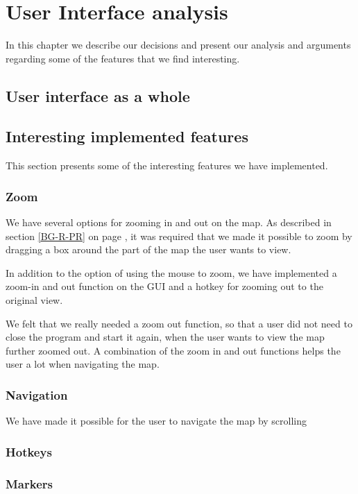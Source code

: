 \chapter{User Interface analysis}
\label{UIA}
In this chapter we describe our decisions and present our analysis and
arguments regarding some of the features that we find interesting.

\section{User interface as a whole}
\label{UIA-UIW}


\section{Interesting implemented features}
\label{UIA-IF}
This section presents some of the interesting features we have implemented.
\subsection{Zoom}
\label{UIA-IF-Z}
We have several options for zooming in and out on the map. As described in
section \ref{BG-R-PR} on page \pageref{BG-R-PR}, it was required that we made it
possible to zoom by dragging a box around the part of the map the user wants to
view.

In addition to the option of using the mouse to zoom, we have implemented a
zoom-in and out function on the GUI and a hotkey for zooming out to the original
view. 

We felt that we really needed a zoom out function, so that a user did not
need to close the program and start it again, when the user wants to view the
map further zoomed out. A combination of the zoom in and out functions helps the
user a lot when navigating the map.

\subsection{Navigation}
\label{UIA-IF-N}
We have made it possible for the user to navigate the map by scrolling 

\subsection{Hotkeys}
\label{UIA-IF-H}
\subsection{Markers}
\label{UIA-IF-M}
